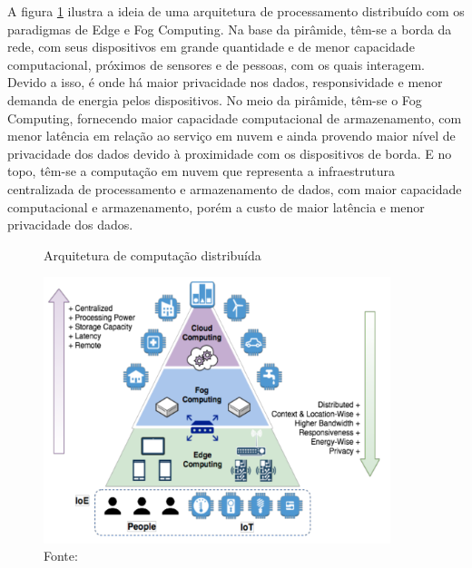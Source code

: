 A figura \ref{fig:arquitetura} ilustra a ideia de uma arquitetura de processamento distribuído com os paradigmas de Edge e Fog Computing. Na base da pirâmide, têm-se a borda da rede, com seus dispositivos em grande quantidade e de menor capacidade computacional, próximos de sensores e de pessoas, com os quais interagem. Devido a isso, é onde há maior privacidade nos dados, responsividade e menor demanda de energia pelos dispositivos. No meio da pirâmide, têm-se o Fog Computing, fornecendo maior capacidade computacional de armazenamento, com menor latência em relação ao serviço em nuvem e ainda provendo maior nível de privacidade dos dados devido à proximidade com os dispositivos de borda. E no topo, têm-se a computação em nuvem que representa a infraestrutura centralizada de processamento e armazenamento de dados, com maior capacidade computacional e armazenamento, porém a custo de maior latência e menor privacidade dos dados.

\begin{figure}[H]
    \centering
    \caption[Arquitetura de computação distribuída]{Arquitetura de computação distribuída}
    \includegraphics[width=0.9\textwidth]{Cap2_Revisao_Teorica/Figures/arquitetura_distribuida.png}
    \caption*{Fonte: \cite{Pacheco2018}}
    \label{fig:arquitetura}
\end{figure}

